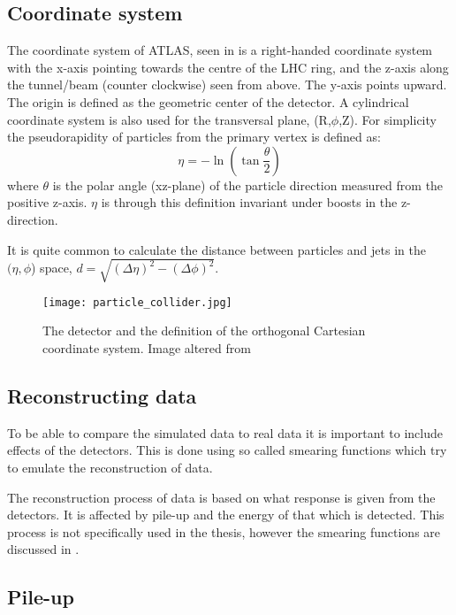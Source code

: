 \subsection{Coordinate system}\label{sec:eo:subsec:coord}
The coordinate system of ATLAS, seen in  is a right-handed coordinate system with the x-axis pointing towards the centre of the LHC ring, and the z-axis along the tunnel/beam (counter clockwise) seen from above. The y-axis points upward. The origin is defined as the geometric center of the detector. A cylindrical coordinate system is also used for the transversal plane, (R,$\phi$,Z).
For simplicity the pseudorapidity of particles from the primary vertex is defined as:
\begin{equation}
\eta = - \ln( \tan\frac{\theta}{2})
\end{equation}
where $\theta$ is the polar angle (xz-plane) of the particle direction measured from the positive z-axis. 
$\eta$ is through this definition invariant under boosts in the z-direction.

It is quite common to calculate the distance between particles and jets in the $(\eta,\phi$) space, $d=\sqrt{(\Delta \eta)^2 - (\Delta \phi)^2}$. 

\begin{figure}[ht]
\begin{center}
\texttt{[image: particle\_collider.jpg]}
\caption{The \abbrATLAS detector and the definition of the orthogonal Cartesian coordinate system. Image altered from\citep{coordimage}}
\label{fig:coordinatesystem}
\end{center}
\end{figure}

\subsection{Reconstructing data}\label{sec:eo:subsec:reco}
To be able to compare the simulated data to real data it is important to include effects of the detectors. This is done using so called smearing functions which try to emulate the reconstruction of data. 

The reconstruction process of data \citep{1129811} is based on what response is given from the detectors. It is affected by pile-up and the energy of that which is detected. This process is not specifically used in the thesis, however the smearing functions are discussed in .

\subsection{Pile-up}\label{sec:eo:subsec:pile}

